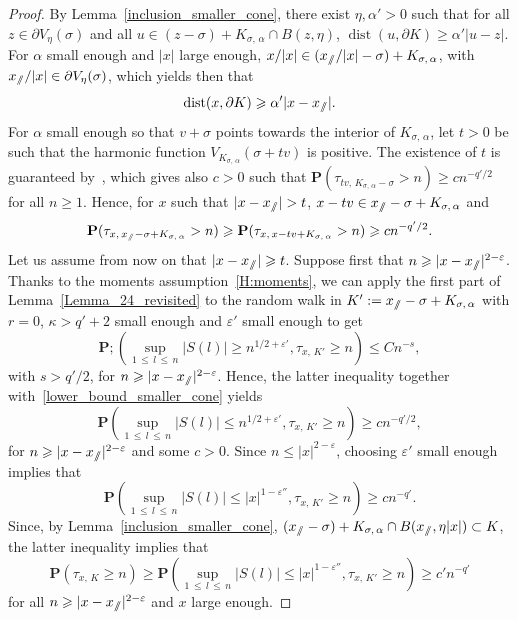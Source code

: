 \documentclass[10pt]{amsart}
\theoremstyle{definition}\newtheorem{defi}[theo]{Definition}\newtheorem{rema}[theo]{Remark}\newtheorem{exam}[theo]{Example}\newtheorem{exem}[theo]{Example}\newtheorem{nota}[theo]{Notation}
\DeclareMathOperator{\dist}{dist}
\newcommand{\pr}{\mathbf{P}}
\renewcommand{\epsilon}{\varepsilon}
\renewcommand{\leq}{\leqslant}
\renewcommand{\geq}{\geqslant}
\newcommand{\sslash}{\slash\mkern-6.4mu\slash}
\begin{document}
\begin{proof}
By Lemma~\ref{inclusion_smaller_cone}, there exist $\eta,\alpha'>0$ such that for all $z\in \partial V_{\eta}(\sigma)$ and all $u\in (z-\sigma)+K_{\sigma,\,\alpha}\cap B(z,\eta)$, $\dist(u,\partial K)\geq \alpha'| u-z|$. For $\alpha$ small enough and $| x|$ large enough, $x/| x|\in (x_{\sslash}/| x|-\sigma)+K_{\sigma,\,\alpha}$, with $x_{\sslash}/| x|\in \partial V_{\eta}(\sigma)$, which yields then that
\begin{equation}\label{linear_distance_boundary}
\dist(x,\partial K)\geq \alpha'| x-x_{\sslash}|.
\end{equation}
For $\alpha$ small enough so that $v+\sigma$ points towards the interior of $K_{\sigma,\,\alpha}$, let $t>0$ be such that the harmonic function $V_{K_{\sigma,\,\alpha}}(\sigma+tv)$ is positive. The existence of $t$ is guaranteed by~\cite[Theorem~1]{DeWa-15}, which gives also $c>0$ such that $\pr(\tau_{tv,\,K_{\sigma,\,\alpha}-\sigma}>n)\geq cn^{-q'/2}$ for all $n\geq 1$. Hence, for $x$ such that $| x-x_{\sslash}|>t$, $x-tv\in x_{\sslash}-\sigma+K_{\sigma,\,\alpha}$ and
\begin{equation}\label{lower_bound_smaller_cone}
\pr(\tau_{x,\,x_{\sslash}-\sigma+K_{\sigma,\,\alpha}}>n)\geq \pr(\tau_{x,\,x-tv+K_{\sigma,\,\alpha}}>n)\geq cn^{-q'/2}.
\end{equation}
Let us assume from now on that $|x-x_{\sslash}| \geq t$. Suppose first that $n\geq | x-x_{\sslash}|^{2-\epsilon}$. Thanks to the moments assumption~\eqref{H:moments}, we can apply the first part of Lemma~\ref{Lemma_24_revisited} to the random walk in $ K':=x_{\sslash}-\sigma+K_{\sigma,\,\alpha}$ with $r=0$, $\kappa>q'+2$ small enough and $\epsilon'$ small enough to get
\[
\pr;\left(\sup_{1\,\leq\,l\,\leq\,n}|S(l)|\geq n^{1/2+\epsilon'}, \tau_{x,\,K'}\geq n\right)\leq Cn^{-s},
\]
with $s>q'/2$, for $n\geq |x-x_{\sslash}|^{2-\epsilon}$. Hence, the latter inequality together with~\eqref{lower_bound_smaller_cone} yields
\[
\pr\left(\sup_{1\,\leq\,l\,\leq\,n}|S(l)|\leq n^{1/2+\epsilon'}, \tau_{x,\,K'}\geq n\right)\geq cn^{-q'/2},
\]
for $n\geq |x-x_{\sslash}|^{2-\epsilon}$ and some $c>0$. Since $n\leq | x|^{2-\epsilon}$, choosing $\epsilon'$ small enough implies that
\[
\pr\left(\sup_{1\,\leq\,l\,\leq\,n}|S(l)|\leq |x|^{1-\epsilon''}, \tau_{x,\,K'}\geq n\right)\geq cn^{-q'}.
\]
Since, by Lemma~\ref{inclusion_smaller_cone}, $(x_{\sslash}-\sigma)+K_{\sigma,\,\alpha}\cap B(x_{\sslash},\eta |x|)\subset K$, the latter inequality implies that
\[
\pr\left(\tau_{x,\,K}\geq n\right)\geq \pr\left(\sup_{1\,\leq\,l\,\leq\,n}|S(l)|\leq |x|^{1-\epsilon''}, \tau_{x,\,K'}\geq n\right)\geq c'n^{-q'}
\]
for all $n\geq |x-x_{\sslash}|^{2-\epsilon}$ and $x$ large enough.


\end{proof}
\end{document}
